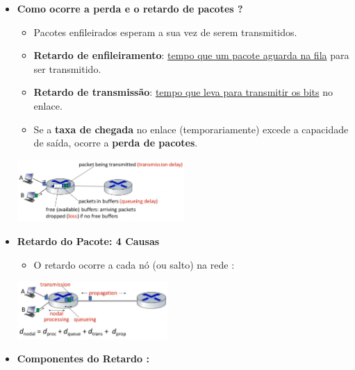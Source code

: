    \begin{itemize}[left=0.5cm, align=left, nosep]
        
        \item \textbf{Como ocorre a perda e o retardo de pacotes ?} 
        \begin{itemize}[left=0.5cm, nosep, label=$\hookrightarrow$]
            \item Pacotes enfileirados esperam a sua vez de serem transmitidos. 
            \item \textbf{Retardo de enfileiramento}: \underline{tempo que um pacote aguarda na fila} para ser transmitido. 
            \item \textbf{Retardo de transmissão}: \underline{tempo que leva para transmitir os bits} no enlace. 
            \item Se a \textbf{taxa de chegada} no enlace (temporariamente) excede a capacidade de saída, ocorre a \textbf{perda de pacotes}. 
        \end{itemize} 
        
        \begin{center}
            \includegraphics[width=0.5\textwidth]{img/cap-01/delay1.png}
        \end{center}

        \item \textbf{Retardo do Pacote: 4 Causas}
        \begin{itemize}[left=0.5cm, nosep, label=$\hookrightarrow$]
            \item O retardo ocorre a cada nó (ou salto) na rede : 
        \end{itemize} 
        
        \begin{center}
            \includegraphics[width=0.45\textwidth]{img/cap-01/delay2.png}
        \end{center}

        \item \textbf{Componentes do Retardo :}
            

\end{itemize}
